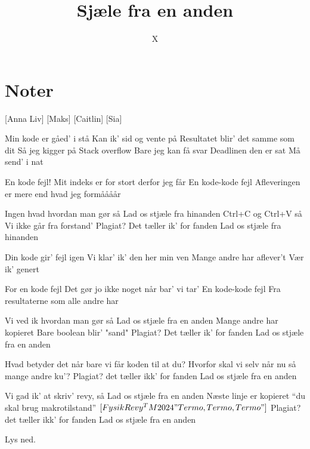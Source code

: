 \documentclass{article}
\title{Sjæle fra en anden}
\author{X}
\begin{document}
                
\maketitle
\section*{Noter}                %
\begin{roles}
[Anna Liv]
[Maks]
[Caitlin]
 [Sia]
\end{roles}

\begin{props}

\prop{} 
\end{props}

\newpage%
\begin{song}

 Min kode er gåed' i stå 
 Kan ik' sid og vente på 
 Resultatet blir' det samme som dit 
 Så jeg kigger på 
 Stack overflow 
 Bare jeg kan få svar 
 Deadlinen den er sat 
Må send' i nat 

 En kode fejl! 
 Mit indeks er for stort derfor jeg får 
 En kode-kode fejl 
 Afleveringen er mere end hvad jeg formåååår 

 Ingen hvad hvordan man gør så 
Lad os stjæle fra hinanden 
Ctrl+C og Ctrl+V så 
Vi ikke går fra forstand' 
Plagiat? Det tæller ik' for fanden 
Lad os stjæle fra hinanden 

 Din kode gir' fejl igen 
 Vi klar' ik' den her min ven 
 Mange andre har aflever't
Vær ik' genert 

 For en kode fejl 
 Det gør jo ikke noget når bar' vi tar' 
 En kode-kode fejl 
 Fra resultaterne som alle andre har 

Vi ved ik hvordan man gør så 
Lad os stjæle fra en anden 
Mange andre har kopieret 
Bare boolean blir' "sand"
Plagiat? Det tæller ik' for fanden 
Lad os stjæle fra en anden

 Hvad betyder det når bare vi får koden til at du?
 Hvorfor skal vi selv når nu så mange andre ku’?
Plagiat? det tæller ikk’ for fanden
Lad os stjæle fra en anden

Vi gad ik’ at skriv’ revy, så
Lad os stjæle fra en anden
Næste linje er kopieret
“du skal brug makrotilstand” $[FysikRevy^TM 20  24 "Termo, Termo, Termo"]$
Plagiat? det tæller ikk’ for fanden
Lad os stjæle fra en anden


\scene Lys ned.

\end{song}
\end{document}
